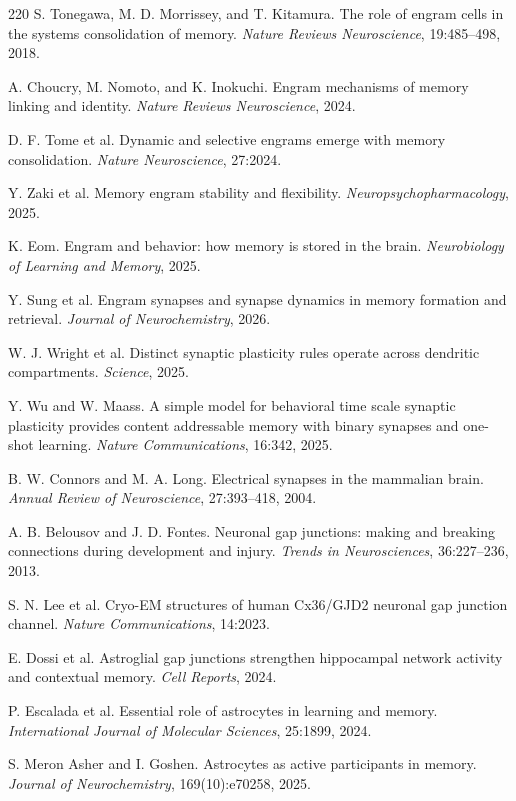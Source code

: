 \documentclass[11pt]{article}
\newcommand{\1}{\mathbf{1}}
\begin{document}
\begin{thebibliography}{220}
S. Tonegawa, M. D. Morrissey, and T. Kitamura. The role of engram cells in the systems consolidation of memory. \emph{Nature Reviews Neuroscience}, 19:485--498, 2018.

A. Choucry, M. Nomoto, and K. Inokuchi. Engram mechanisms of memory linking and identity. \emph{Nature Reviews Neuroscience}, 2024.

D. F. Tome et al. Dynamic and selective engrams emerge with memory consolidation. \emph{Nature Neuroscience}, 27:2024.

Y. Zaki et al. Memory engram stability and flexibility. \emph{Neuropsychopharmacology}, 2025.

K. Eom. Engram and behavior: how memory is stored in the brain. \emph{Neurobiology of Learning and Memory}, 2025.

Y. Sung et al. Engram synapses and synapse dynamics in memory formation and retrieval. \emph{Journal of Neurochemistry}, 2026.

W. J. Wright et al. Distinct synaptic plasticity rules operate across dendritic compartments. \emph{Science}, 2025.

Y. Wu and W. Maass. A simple model for behavioral time scale synaptic plasticity provides content addressable memory with binary synapses and one-shot learning. \emph{Nature Communications}, 16:342, 2025.

B. W. Connors and M. A. Long. Electrical synapses in the mammalian brain. \emph{Annual Review of Neuroscience}, 27:393--418, 2004.

A. B. Belousov and J. D. Fontes. Neuronal gap junctions: making and breaking connections during development and injury. \emph{Trends in Neurosciences}, 36:227--236, 2013.

S. N. Lee et al. Cryo-EM structures of human Cx36/GJD2 neuronal gap junction channel. \emph{Nature Communications}, 14:2023.

E. Dossi et al. Astroglial gap junctions strengthen hippocampal network activity and contextual memory. \emph{Cell Reports}, 2024.

P. Escalada et al. Essential role of astrocytes in learning and memory. \emph{International Journal of Molecular Sciences}, 25:1899, 2024.

S. Meron Asher and I. Goshen. Astrocytes as active participants in memory. \emph{Journal of Neurochemistry}, 169(10):e70258, 2025.


\end{thebibliography}
\end{document}
